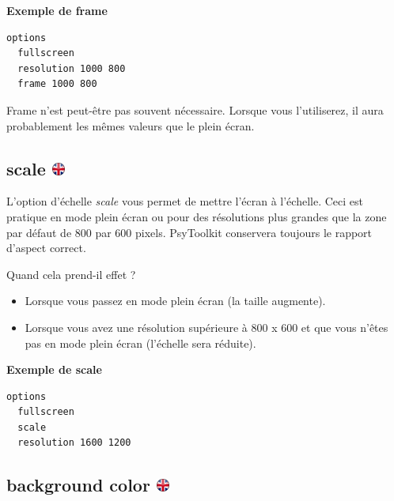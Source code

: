 \documentclass[
]{book}
\providecommand{\tightlist}{%
  \setlength{\itemsep}{0pt}\setlength{\parskip}{0pt}}
\begin{document}
\textbf{Exemple de frame}

\begin{verbatim}
options
  fullscreen
  resolution 1000 800
  frame 1000 800
\end{verbatim}

Frame n'est peut-être pas souvent nécessaire. Lorsque vous l'utiliserez, il aura probablement les mêmes valeurs que le plein écran.

\hypertarget{scale}{%
\subsection[scale ]{\texorpdfstring{scale \href{https://www.psytoolkit.org/doc3.4.0/syntax.html\#options-scale}{\protect\includegraphics{img/ukflag.png}}}{scale }}\label{scale}}

L'option d'échelle \emph{scale} vous permet de mettre l'écran à l'échelle. Ceci est pratique en mode plein écran ou pour des résolutions plus grandes que la zone par défaut de 800 par 600 pixels. PsyToolkit conservera toujours le rapport d'aspect correct.

Quand cela prend-il effet ?

\begin{itemize}
\tightlist
\item
  Lorsque vous passez en mode plein écran (la taille augmente).
\item
  Lorsque vous avez une résolution supérieure à 800 x 600 et que vous n'êtes pas en mode plein écran (l'échelle sera réduite).
\end{itemize}

\textbf{Exemple de scale}

\begin{verbatim}
options
  fullscreen
  scale
  resolution 1600 1200
\end{verbatim}

\hypertarget{background-color}{%
\subsection[background color ]{\texorpdfstring{background color \href{https://www.psytoolkit.org/doc3.4.0/syntax.html\#options-background}{\protect\includegraphics{img/ukflag.png}}}{background color }}\label{background-color}}
\end{document}
